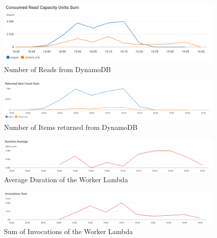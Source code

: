 \documentclass[english]{scrartcl}
\begin{document}
\begin{figure}
    \centering
    \includegraphics[width=\textwidth]{img/CloudWatchDynamoDBReadCapacityUnitsSum}
    \caption{Number of Reads from DynamoDB}
    \label{fig:screenshot}
\end{figure}

\begin{figure}
    \centering
    \includegraphics[width=\textwidth]{img/CloudWatchDynamoDBReturnedItemCountSum}
    \caption{Number of Items returned from DynamoDB}
    \label{fig:screenshot}
\end{figure}

\begin{figure}
    \centering
    \includegraphics[width=\textwidth]{img/CloudWatchLambdaDurationAverage}
    \caption{Average Duration of the Worker Lambda}
    \label{fig:screenshot}
\end{figure}

\begin{figure}
    \centering
    \includegraphics[width=\textwidth]{img/CloudWatchLambdaInvocationsSum}
    \caption{Sum of Invocations of the Worker Lambda}
    \label{fig:screenshot}
\end{figure}
\end{document}
